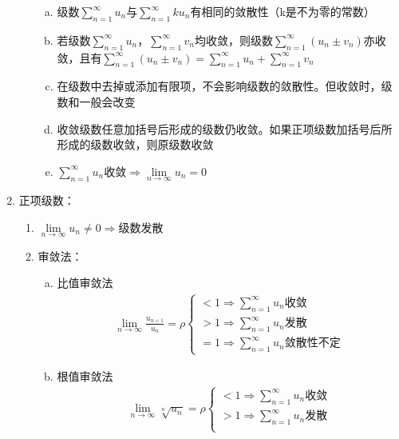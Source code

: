 \documentclass[12pt]{book}
\begin{document}
\begin{enumerate}[1.]
\begin{enumerate}[(1)]
\begin{enumerate}[a.]
                        \item 级数$\sum_{n=1}^{\infty}{u_n}$与$\sum_{n=1}^{\infty}{k u_n}$有相同的敛散性（k是不为零的常数）
                        \item 若级数$\sum_{n=1}^{\infty}{u_n}$，$\sum_{n=1}^{\infty}{v_n}$均收敛，则级数$\sum_{n=1}^{\infty}{(u_n\pm v_n)}$亦收敛，且有$\sum_{n=1}^{\infty}{(u_n\pm v_n)}=\sum_{n=1}^{\infty}{u_n}+\sum_{n=1}^{\infty}{v_n}$
                        \item 在级数中去掉或添加有限项，不会影响级数的敛散性。但收敛时，级数和一般会改变
                        \item 收敛级数任意加括号后形成的级数仍收敛。如果正项级数加括号后所形成的级数收敛，则原级数收敛
                        \item $\sum_{n=1}^{\infty}{u_n}$收敛$\Rightarrow \lim\limits_{n\rightarrow\infty}{u_n}=0$
                    \end{enumerate}
          \end{enumerate}
    \item 正项级数：
    \begin{enumerate}[(1)]
        \item $\lim\limits_{n\rightarrow\infty}{u_n}\neq 0\Rightarrow$级数发散
        \item 审敛法：
        \begin{enumerate}[a.]
            \item 比值审敛法
            \begin{gather*}
                \lim_{n\rightarrow\infty}{\frac{u_{n+1}}{u_{n}}}=\rho \begin{cases}
                    <1 \Rightarrow \sum_{n=1}^{\infty}{u_n} \text{收敛} \\
                    >1 \Rightarrow \sum_{n=1}^{\infty}{u_n} \text{发散} \\
                    =1 \Rightarrow \sum_{n=1}^{\infty}{u_n} \text{敛散性不定} 
                \end{cases}
            \end{gather*}
            \item 根值审敛法
            \begin{gather*}
                \lim_{n\rightarrow\infty}{\sqrt[n]{u_n}}=\rho \begin{cases}
                    <1 \Rightarrow \sum_{n=1}^{\infty}{u_n} \text{收敛} \\
                    >1 \Rightarrow \sum_{n=1}^{\infty}{u_n} \text{发散} \\

\end{cases}
\end{gather*}
\end{enumerate}
\end{enumerate}
\end{enumerate}
\end{document}
